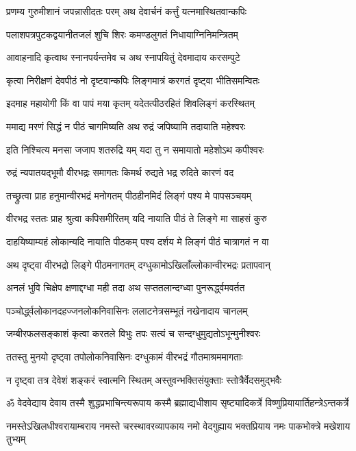 \twolineshloka
{प्रणम्य गुरुमीशानं जपन्नासीदतः परम्}
{अथ देवार्चनं कर्त्तुं यत्नमास्थितवान्कपिः}%

\twolineshloka
{पलाशपत्रपुटकद्वयानीतजलं शुचि}
{शिरः कमण्डलुगतं निधायाग्निनिमन्त्रितम्}%

\twolineshloka
{आवाहनादि कृत्वाथ स्नानपर्यन्तमेव च}
{अथ स्नापयितुं देवमादाय करसम्पुटे}%

\twolineshloka
{कृत्वा निरीक्षणं देवपीठं नो दृष्टवान्कपिः}
{लिङ्गमात्रं करगतं दृष्ट्वा भीतिसमन्वितः}%

\twolineshloka
{इदमाह महायोगी किं वा पापं मया कृतम्}
{यदेतत्पीठरहितं शिवलिङ्गं करस्थितम्}%

\twolineshloka
{ममाद्य मरणं सिद्धं न पीठं चागमिष्यति}
{अथ रुद्रं जपिष्यामि तदायाति महेश्वरः}%

\twolineshloka
{इति निश्चित्य मनसा जजाप शतरुद्रि यम्}
{यदा तु न समायातो महेशोऽथ कपीश्वरः}%

\twolineshloka
{रुद्रं न्यपातयद्भूमौ वीरभद्रः समागतः}
{किमर्थ रुद्यते भद्र रुदिते कारणं वद}%

\twolineshloka
{तच्छ्रुत्वा प्राह हनुमान्वीरभद्रं मनोगतम्}
{पीठहीनमिदं लिङ्गं पश्य मे पापसञ्चयम्}%

\twolineshloka
{वीरभद्र स्ततः प्राह श्रुत्वा कपिसमीरितम्}
{यदि नायाति पीठं ते लिङ्गे मा साहसं कुरु}%

\twolineshloka
{दाहयिष्याम्यहं लोकान्यदि नायाति पीठकम्}
{पश्य दर्शय मे लिङ्गं पीठं चात्रागतं न वा}%

\twolineshloka
{अथ दृष्ट्वा वीरभद्रो लिङ्गे पीठमनागतम्}
{दग्धुकामोऽखिलाँल्लोकान्वीरभद्रः प्रतापवान्}%

\twolineshloka
{अनलं भुवि चिक्षेप क्षणाद्दग्धा मही तदा}
{अथ सप्ततलान्दग्ध्वा पुनरूर्द्ध्वमवर्तत}%

\twolineshloka
{पञ्चोर्द्ध्वलोकानदहज्जनलोकनिवासिनः}
{ललाटनेत्रसम्भूतं नखेनादाय चानलम्}%

\twolineshloka
{जम्बीरफलसङ्काशं कृत्वा करतले विभुः}
{तपः सत्यं च सन्दग्धुमुद्यतोऽभून्मुनीश्वरः}%

\twolineshloka
{ततस्तु मुनयो दृष्ट्वा तपोलोकनिवासिनः}
{दग्धुकामं वीरभद्रं गौतमाश्रममागताः}%

\twolineshloka
{न दृष्ट्वा तत्र देवेशं शङ्करं स्वात्मनि स्थितम्}
{अस्तुवन्भक्तिसंयुक्ताः स्तोत्रैर्वेदसमुद्भवैः}%

\twolineshloka
{ॐ वेदवेद्याय देवाय तस्मै शुद्धप्रभाचिन्त्यरूपाय कस्मै}
{ब्रह्माद्यधीशाय सृष्ट्यादिकर्त्रे विष्णुप्रियायार्तिहन्त्रेऽन्तकर्त्रे}%

\twolineshloka
{नमस्तेऽखिलधीश्वरायाम्बराय नमस्ते चरस्थावरव्यापकाय}
{नमो वेदगुह्याय भक्तप्रियाय नमः पाकभोक्त्रे मखेशाय तुभ्यम्}%


